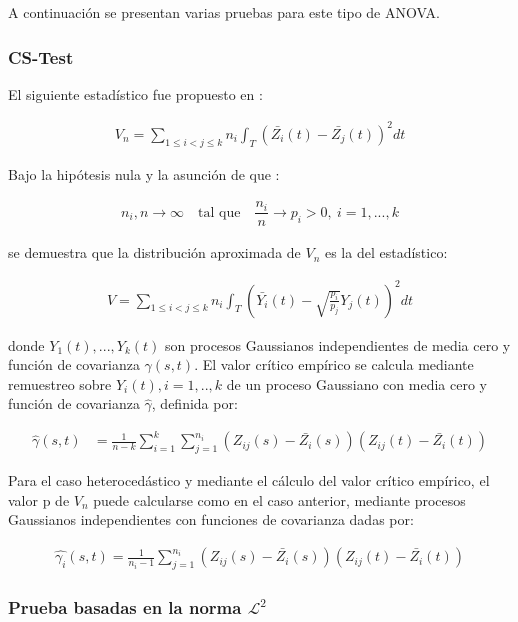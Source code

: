 \documentclass[
]{book}
\begin{document}
A continuación se presentan varias pruebas para este tipo de ANOVA.

\hypertarget{cs-test}{%
\subsubsection*{CS-Test}\label{cs-test}}

El siguiente estadístico fue propuesto en \citep{cuevas}:

\begin{align}
    V_n=\sum_{1\leq i<j\leq k} n_i\int_T ({\bar{Z_i}}(t)-{\bar{Z_j}}(t))^2dt
\end{align}

Bajo la hipótesis nula y la asunción de que :

\begin{align}
 n_i,n \to \infty \quad \text{tal que}\quad  \dfrac{n_i}{n}\to p_i >0,\ i=1,...,k
\end{align}

se demuestra que la distribución aproximada de \(V_n\) es la del estadístico:

\begin{align}
    V=\sum_{1\leq i<j\leq k} n_i\int_T \left(\bar{Y_i}(t)-\sqrt{\frac{p_i}{p_j}}Y_j(t)\right)^2dt
\end{align}

donde \(Y_1(t),...,Y_k(t)\) son procesos Gaussianos independientes de media cero y función de covarianza \(\gamma(s,t)\). El valor crítico empírico se calcula mediante remuestreo sobre \(Y_i(t),i=1,..,k\) de un proceso Gaussiano con media cero y función de covarianza \({\hat{\gamma}}\), definida por:

\begin{align}
    {\hat{\gamma}}(s,t)&=\frac{1}{n-k}\sum_{i=1}^k\sum_{j=1}^{n_i}(Z_{ij}(s)-\bar{Z_i}(s))(Z_{ij}(t)-\bar{Z_i}(t))
\end{align}

Para el caso heterocedástico y mediante el cálculo del valor crítico empírico, el valor p de \(V_n\) puede calcularse como en el caso anterior, mediante procesos Gaussianos independientes con funciones de covarianza dadas por:

\begin{align}
    {\hat{\gamma_i}}(s,t)=\frac{1}{n_i-1}\sum_{j=1}^{n_i}(Z_{ij}(s)-\bar{Z_i}(s))(Z_{ij}(t)-\bar{Z_i}(t))
\end{align}

\hypertarget{prueba-basadas-en-la-norma-mathcall2}{%
\subsubsection*{\texorpdfstring{Prueba basadas en la norma \(\mathcal{L}^2\)}{Prueba basadas en la norma \textbackslash mathcal\{L\}\^{}2}}\label{prueba-basadas-en-la-norma-mathcall2}}
\end{document}

